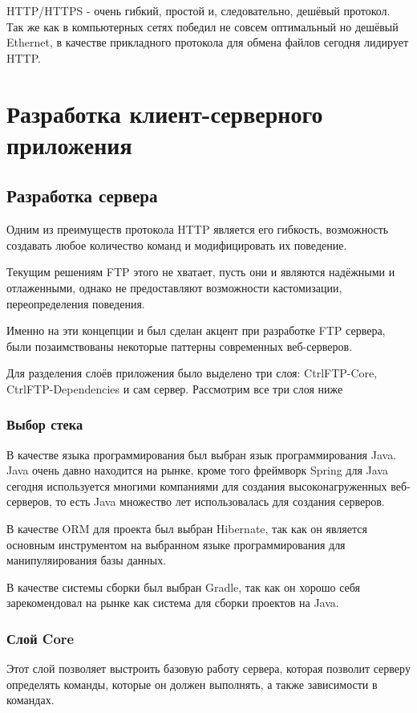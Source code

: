 \documentclass[a4paper,14pt]{extarticle}
\begin{document}
HTTP/HTTPS - очень гибкий, простой и, следовательно, дешёвый протокол. Так же как в компьютерных 
сетях победил не совсем оптимальный но дешёвый Ethernet, в качестве прикладного протокола для обмена файлов
сегодня лидирует HTTP.

\newpage

\section{Разработка клиент-серверного приложения}
\subsection{Разработка сервера}
Одним из преимуществ протокола HTTP является его гибкость, возможность создавать 
любое количество команд и модифицировать их поведение. 

Текущим решениям FTP этого не хватает, пусть они и являются надёжными и отлаженными, однако
не предоставляют возможности кастомизации, переопределения поведения.

Именно на эти концепции и был сделан акцент при разработке FTP сервера, были позаимствованы
некоторые паттерны современных веб-серверов. 

Для разделения слоёв приложения было выделено три слоя: CtrlFTP-Core, CtrlFTP-Dependencies и сам сервер. 
Рассмотрим все три слоя ниже

\subsubsection{Выбор стека}
В качестве языка программирования был выбран язык программирования Java. 
Java очень давно находится на рынке, кроме того фреймворк Spring для Java
сегодня используется многими компаниями для создания высоконагруженных
веб-серверов, то есть Java множество лет использовалась для создания серверов.

В качестве ORM для проекта был выбран Hibernate, так как он является основным
инструментом на выбранном языке программирования для манипуляирования базы данных.

В качестве системы сборки был выбран Gradle, так как он хорошо себя зарекомендовал
на рынке как система для сборки проектов на Java. 

\subsubsection{Слой Core}
Этот слой позволяет выстроить базовую работу сервера, которая позволит серверу определять
команды, которые он должен выполнять, а также зависимости в командах. 
\end{document}
